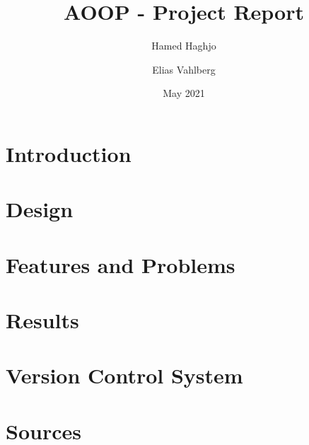 \documentclass{article}
\title{AOOP - Project Report}
\author{Hamed Haghjo \and Elias Vahlberg}
\date{May 2021}
\begin{document}
\maketitle
\tableofcontents
\newpage
\section{Introduction}


\newpage
\section{Design}
\newpage


\newpage
\section{Features and Problems}


\newpage
\section{Results}

\newpage
\section{Version Control System}


\newpage
\section{Sources}
\end{document}
